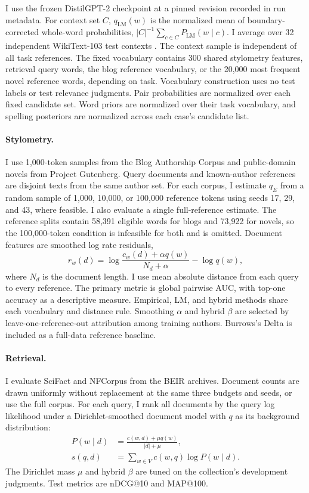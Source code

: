 \documentclass[11pt]{article}
\begin{document}
I use the frozen DistilGPT-2 checkpoint \citep{sanh2019distilbert,distilgpt2}
at a pinned revision recorded in run metadata. For context set $C$,
$q_{\mathrm{LM}}(w)$ is the normalized mean of boundary-corrected whole-word
probabilities, $|C|^{-1}\sum_{c\in C}P_{\mathrm{LM}}(w\mid c)$. I average over
32 independent WikiText-103 test contexts \citep{merity2017pointer}. The
context sample is independent of all task references. The fixed vocabulary
contains 300 shared stylometry features, retrieval query words, the blog
reference vocabulary, or the 20,000 most frequent novel reference words,
depending on task. Vocabulary construction uses no test labels or test
relevance judgments. Pair probabilities are normalized over each fixed
candidate set. Word priors are normalized over their task vocabulary, and
spelling posteriors are normalized across each case's candidate list.

\paragraph{Stylometry.} I use 1,000-token samples from the Blog Authorship
Corpus \citep{schler2006effects} and public-domain novels from Project
Gutenberg. Query documents and known-author references are disjoint texts from
the same author set. For each corpus, I estimate $q_E$ from a random sample of
1,000, 10,000, or 100,000 reference tokens using seeds 17, 29, and 43, where
feasible. I also evaluate a single full-reference estimate. The reference
splits contain 58,391 eligible words for blogs and 73,922 for novels, so the
100,000-token condition is infeasible for both and is omitted.
Document features are smoothed log rate residuals,
\begin{equation}
 r_w(d)=\log\frac{c_w(d)+\alpha q(w)}{N_d+\alpha}-\log q(w),
\end{equation}
where $N_d$ is the document length. I use mean absolute distance from each
query to every reference. The primary metric is global pairwise AUC, with
top-one accuracy as a descriptive measure. Empirical, LM, and hybrid methods
share each vocabulary and distance rule. Smoothing $\alpha$ and hybrid $\beta$
are selected by leave-one-reference-out attribution among training authors.
Burrows's Delta is included as a full-data reference baseline.

\paragraph{Retrieval.} I evaluate SciFact and NFCorpus from the BEIR archives.
Document counts are drawn uniformly without replacement at the same three
budgets and seeds, or use the full corpus. For each query, I rank all
documents by the query log likelihood under a Dirichlet-smoothed document
model with $q$ as its background distribution:
\begin{align}
 P(w\mid d)&=\frac{c(w,d)+\mu q(w)}{|d|+\mu},\\
 s(q,d)&=\sum_{w\in V}c(w,q)\log P(w\mid d).
\end{align}
The Dirichlet mass $\mu$ and hybrid $\beta$ are tuned on the collection's
development judgments. Test metrics are nDCG@10 and MAP@100.
\end{document}

